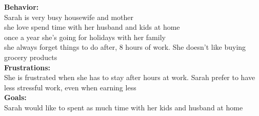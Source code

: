\documentclass[a4paper,10pt,oneside]{scrreprt}
\begin{document}
\begin{mdframed}
\begin{minipage}{\textwidth}
				\textbf{Behavior:}\\
				Sarah is very busy housewife and mother\\
				she love spend time with her husband and kids at home\\
				once a year she's going for holidays with her family\\
				she always forget things to do after, 8 hours of work. She doesn't like buying grocery products\\
				
				\textbf{Frustrations:}\\
				She is frustrated when she has to stay after hours at work. Sarah prefer to have less stressful work, even when earning less\\
				
				\textbf{Goals:}\\
				Sarah would like to spent as much time with her kids and husband at home\\
				
			\end{minipage}
		\end{mdframed}

		


		\clearpage
\end{document}
